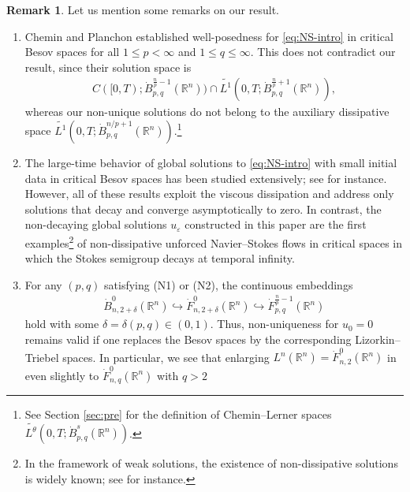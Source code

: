 \documentclass[a4paper,12pt,reqno]{amsart}
\theoremstyle{plain}
\theoremstyle{definition}
\newtheorem{rem}[thm]{Remark}
\renewcommand{\leq}{\leqslant}
\newcommand{\R}{\mathbb{R}}
\begin{document}
\begin{rem}\label{rem:main}
Let us mention some remarks on our result.
\begin{enumerate}[label=\arabic*.]
    \item 
      Chemin \cite{Che-92} and Planchon \cite{Pla-98} established well-posedness for \eqref{eq:NS-intro} in critical Besov spaces
      for all $1\leq p<\infty$ and $1\leq q\leq \infty$.
      This does not contradict our result, since their solution space is 
      \begin{align}\label{Che-class}
      C([0,T);\dot{B}_{p,q}^{\frac{n}{p}-1}(\mathbb{R}^n))
      \cap 
      \widetilde{L^1}(0,T;\dot{B}_{p,q}^{\frac{n}{p}+1}(\mathbb{R}^n)),
      \end{align}
      whereas our non-unique solutions do not belong to the auxiliary dissipative space
      $\widetilde{L^1}(0,T;\dot{B}_{p,q}^{n/p+1}(\mathbb{R}^n))$.\footnote{See Section \ref{sec:pre} for the definition of Chemin--Lerner spaces $\widetilde{L^{\theta}}(0,T;\dot{B}_{p,q}^s(\R^n))$.}
    \item 
      The large-time behavior of global solutions to \eqref{eq:NS-intro} with small initial data in critical Besov spaces has been studied extensively; see \cites{Pla-98,Nakasato-25-JDE,Gallagher-Iftimie-Planchon-2002,Gallagher-Iftimie-Planchon-2003,Takeuchi-2025,Watanabe-2025,Benameu-2015-JMAA} for instance.
      However, all of these results exploit the viscous dissipation and address only solutions that decay and converge asymptotically to zero.
      In contrast, the non-decaying global solutions $u_{\varepsilon}$ constructed in this paper are the first examples\footnote{In the framework of weak solutions, the existence of non-dissipative solutions is widely known; see \cite{Buc-Vic-19} for instance.} of non-dissipative unforced Navier--Stokes flows in critical spaces in which the Stokes semigroup decays at temporal infinity.
    \item 
      For any $(p,q)$ satisfying (N1) or (N2), 
      the continuous embeddings
      \begin{align}
          \dot{B}_{n,2+\delta}^0(\mathbb{R}^n)\hookrightarrow \dot{F}_{n,2+\delta}^0(\mathbb{R}^n)\hookrightarrow \dot{F}_{p,q}^{\frac{n}{p}-1}(\mathbb{R}^n)
      \end{align}
      hold with some $\delta=\delta(p,q) \in (0,1)$.
      Thus, non-uniqueness for $u_0=0$ remains valid if one replaces the Besov spaces by the corresponding Lizorkin--Triebel spaces.
      In particular, we see that enlarging $L^n(\R^n)=\dot{F}_{n,2}^0(\R^n)$ in \cites{Lio-Mas,Fur-Rie-Ter-2000} even slightly to $\dot{F}_{n,q}^0(\R^n)$ with $q>2$

\end{enumerate}
\end{rem}
\end{document}
